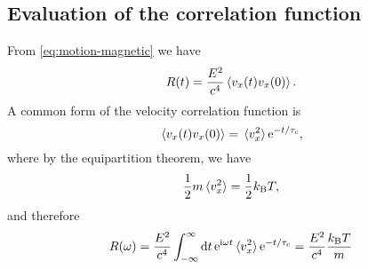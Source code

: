 \documentclass[hyperref, a4paper]{article}
\newcommand*{\ii}{\mathrm{i}}
\newcommand*{\ee}{\mathrm{e}}
\newcommand{\kB}{k_{\text{B}}}
\begin{document}
\subsection{Evaluation of the correlation function}

From \eqref{eq:motion-magnetic} we have 
\begin{equation}
    R(t) = \frac{E^2}{c^4} \expval*{v_x(t) v_x(0)}. 
\end{equation}
A common form of the velocity correlation function is 
\begin{equation}
    \expval*{v_x(t) v_x(0)} = \expval*{v_x^2}  \ee^{- t / \tau_{\text{c}}},
\end{equation}
where by the equipartition theorem, we have 
\begin{equation}
    \frac{1}{2} m \expval*{v_x^2} = \frac{1}{2} \kB T,
\end{equation}
and therefore 
\begin{equation}
    R(\omega) = \frac{E^2}{c^4} \int_{-\infty}^{\infty} \dd{t} \ee^{\ii \omega t} \expval*{v_x^2} \ee^{- t / \tau_{\text{c}}}
    = \frac{E^2}{c^4} \frac{\kB T}{m} 
\end{equation}
\end{document}
